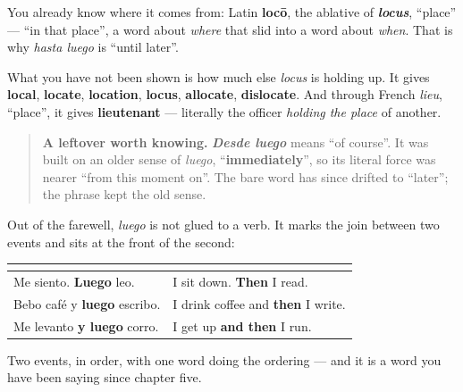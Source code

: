 \begin{cousinweb}
You already know where it comes from: Latin \textbf{locō}, the ablative of \emph{\textbf{locus}}, \textquotedblleft{}place\textquotedblright{} — \textquotedblleft{}in that place\textquotedblright{}, a word about \emph{where} that slid into a word about \emph{when}. That is why \emph{hasta luego} is \textquotedblleft{}until later\textquotedblright{}.

What you have not been shown is how much else \emph{locus} is holding up. It gives \textbf{local}, \textbf{locate}, \textbf{location}, \textbf{locus}, \textbf{allocate}, \textbf{dislocate}. And through French \emph{lieu}, \textquotedblleft{}place\textquotedblright{}, it gives \textbf{lieutenant} — literally the officer \emph{holding the place} of another.

\begin{quote}
\textbf{A leftover worth knowing.} \emph{\textbf{Desde luego}} means \textquotedblleft{}of course\textquotedblright{}. It was built on an older sense of \emph{luego}, \textquotedblleft{}\textbf{immediately}\textquotedblright{}, so its literal force was nearer \textquotedblleft{}from this moment on\textquotedblright{}. The bare word has since drifted to \textquotedblleft{}later\textquotedblright{}; the phrase kept the old sense.
\end{quote}
\end{cousinweb}

\begin{grammarlens}[title={Grammar Lens: luego between two events}]
Out of the farewell, \emph{luego} is not glued to a verb. It marks the join between two events and sits at the front of the second:

\noindent
\begin{tabularx}{\linewidth}{@{}>{\raggedright\arraybackslash}X>{\raggedright\arraybackslash}X@{}}
\toprule
\textbf{} & \textbf{} \\
\midrule
Me siento. \textbf{Luego} leo. & I sit down. \textbf{Then} I read. \\
Bebo café y \textbf{luego} escribo. & I drink coffee and \textbf{then} I write. \\
Me levanto \textbf{y luego} corro. & I get up \textbf{and then} I run. \\
\bottomrule
\end{tabularx}

Two events, in order, with one word doing the ordering — and it is a word you have been saying since chapter five.
\end{grammarlens}

